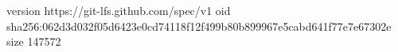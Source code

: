 version https://git-lfs.github.com/spec/v1
oid sha256:062d3d032f05d6423e0cd74118f12f499b80b899967e5cabd641f77e7e67302e
size 147572
